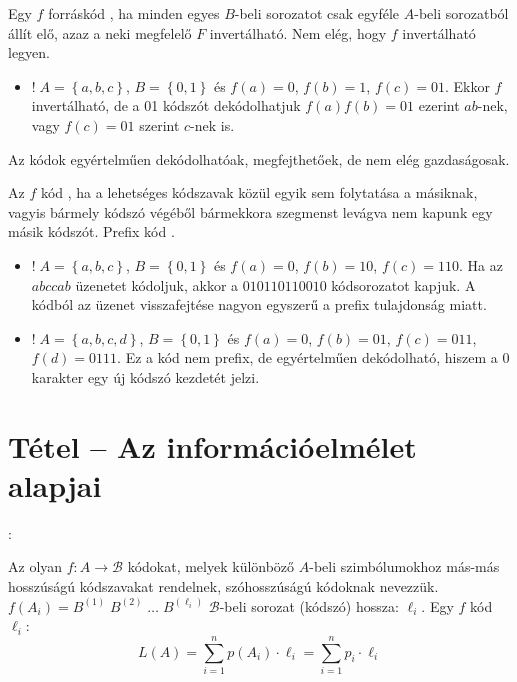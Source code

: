 \documentclass[main.tex]{subfiles}
\begin{document}
  Egy $f$ forráskód ,
  ha minden egyes $B$-beli sorozatot csak egyféle
  $A$-beli sorozatból állít elő, azaz a neki
  megfelelő $F$ invertálható. Nem elég, hogy $f$
  invertálható legyen.
  \begin{itemize}
    \item $! \; A = \left\{a, b, c\right\}$, $B = \left\{ 0, 1\right\}$
    és $f(a) = 0$, $f(b) = 1$, $f(c) = 01$. Ekkor $f$ invertálható,
    de a 01 kódszót dekódolhatjuk $f(a) f(b) = 01$ ezerint $ab$-nek,
    vagy $f(c)=01$ szerint $c$-nek is.
  \end{itemize}
  Az 
  kódok egyértelműen dekódolhatóak, megfejthetőek,
  de nem elég gazdaságosak.

  Az $f$ kód , ha a lehetséges kódszavak közül
  egyik sem folytatása a másiknak, vagyis bármely kódszó
  végéből bármekkora szegmenst levágva nem kapunk egy másik
  kódszót. Prefix kód .
  \begin{itemize}
    \item $! \; A = \left\{a, b, c\right\}$, $B = \left\{ 0, 1\right\}$
    és $f(a) = 0$, $f(b) = 10$, $f(c) = 110$. Ha az $abccab$ üzenetet
    kódoljuk, akkor a $010110110010$ kódsorozatot kapjuk. A kódból
    az üzenet visszafejtése nagyon egyszerű a prefix tulajdonság miatt.

    \item  $! \; A = \left\{a, b, c, d\right\}$, $B = \left\{ 0, 1\right\}$
    és $f(a) = 0$, $f(b) = 01$, $f(c) = 011$, $f(d)=0111$.
    Ez a kód nem prefix, de egyértelműen dekódolható, hiszem a $0$
    karakter egy új kódszó kezdetét jelzi.
  \end{itemize}


  \section{Tétel – Az információelmélet alapjai} %

  {\large {}:}
  \vspace{.5em}

  Az olyan $f: A \rightarrow \mathcal{B}$ kódokat,
  melyek különböző $A$-beli szimbólumokhoz más-más
  hosszúságú kódszavakat rendelnek, 
  szóhosszúságú kódoknak nevezzük.
  $f(A_i) = B^{(1)} \; B^{(2)} \; \dots \; B^{(\ell_i)}$
  $\mathcal{B}$-beli sorozat (kódszó) hossza: ${\ell_i}$.
  Egy $f$ kód  $\ell_i$:
  \begin{equation*}
    L(A) = \sum_{i=1}^n p(A_i) \cdot \ell_i =
    \sum_{i=1}^n p_i \cdot\ell_i
  \end{equation*}
\end{document}
